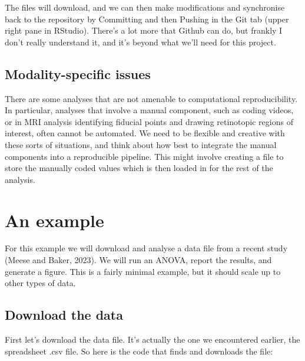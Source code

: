 \documentclass[
]{article}
\begin{document}
The files will download, and we can then make modifications and synchronise back to the repository by Committing and then Pushing in the Git tab (upper right pane in RStudio). There's a lot more that Github can do, but frankly I don't really understand it, and it's beyond what we'll need for this project.

\hypertarget{modality-specific-issues}{%
\subsection{Modality-specific issues}\label{modality-specific-issues}}

There are some analyses that are not amenable to computational reproducibility. In particular, analyses that involve a manual component, such as coding videos, or in MRI analysis identifying fiducial points and drawing retinotopic regions of interest, often cannot be automated. We need to be flexible and creative with these sorts of situations, and think about how best to integrate the manual components into a reproducible pipeline. This might involve creating a file to store the manually coded values which is then loaded in for the rest of the analysis.

\hypertarget{an-example}{%
\section{An example}\label{an-example}}

For this example we will download and analyse a data file from a recent study (Meese and Baker, 2023). We will run an ANOVA, report the results, and generate a figure. This is a fairly minimal example, but it should scale up to other types of data.

\hypertarget{download-the-data}{%
\subsection{Download the data}\label{download-the-data}}

First let's download the data file. It's actually the one we encountered earlier, the spreadsheet .csv file. So here is the code that finds and downloads the file:
\end{document}
